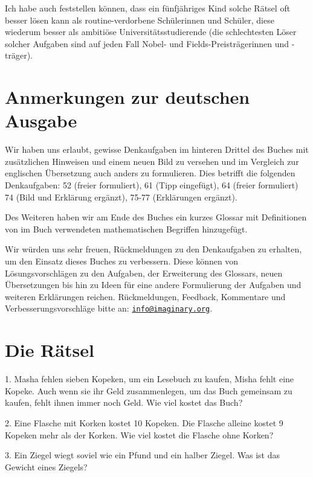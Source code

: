 	Ich habe auch feststellen können, dass ein fünfjähriges Kind solche Rätsel oft besser lösen kann als routine-verdorbene Schülerinnen und Schüler, diese wiederum besser als ambitiöse Universitätsstudierende (die schlechtesten Löser solcher Aufgaben sind auf jeden Fall Nobel- und Fields-Preisträgerinnen und -träger).

\clearpage
\section*{Anmerkungen zur deutschen Ausgabe}
	Wir haben uns erlaubt, gewisse Denkaufgaben im hinteren Drittel des Buches mit zusätzlichen Hinweisen und einem neuen Bild zu versehen und im Vergleich zur englischen Übersetzung auch anders zu formulieren. Dies betrifft die folgenden Denkaufgaben:
	52 (freier formuliert), 61 (Tipp eingefügt), 64 (freier formuliert) 74 (Bild und Erklärung ergänzt), 75-77 (Erklärungen ergänzt).

	Des Weiteren haben wir am Ende des Buches ein kurzes Glossar mit Definitionen von im Buch verwendeten mathematischen Begriffen hinzugefügt.

	Wir würden uns sehr freuen, Rückmeldungen zu den Denkaufgaben zu erhalten, um den Einsatz dieses Buches zu verbessern. Diese können von Lösungsvorschlägen zu den Aufgaben, der Erweiterung des Glossars, neuen Übersetzungen bis hin zu Ideen für eine andere Formulierung der Aufgaben und weiteren Erklärungen reichen. Rückmeldungen, Feedback, Kommentare und Verbesserungsvorschläge bitte an:
	\href{mailto:info@imaginary.org}{\nolinkurl{info@imaginary.org}}.

\clearpage
\section*{Die Rätsel}

\begin{problem}{1.}
	Masha fehlen sieben Kopeken, um ein Lesebuch zu kaufen, Misha fehlt eine Kopeke. Auch wenn sie ihr Geld zusammenlegen, um das Buch gemeinsam zu kaufen, fehlt ihnen immer noch Geld. Wie viel kostet das Buch?
\end{problem}

\begin{problem}{2.}
	Eine Flasche mit Korken kostet 10 Kopeken. Die Flasche alleine kostet 9 Kopeken mehr als der Korken. Wie viel kostet die Flasche ohne Korken?
\end{problem}

\begin{problem}{3.}
	Ein Ziegel wiegt soviel wie ein Pfund und ein halber Ziegel. Was ist das Gewicht eines Ziegels?
\end{problem}

